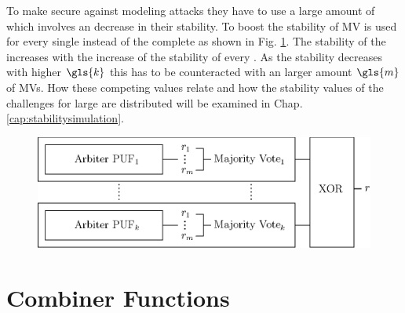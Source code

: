 To make \xpuf secure against modeling attacks they have to use a large amount of \apufs which involves an decrease in their stability.
To boost the stability of \xpufs \ac{MV} is used for every single \apuf instead of the complete \xpuf as shown in Fig. \ref{fig:majorityxorarbiter}.
The stability of the \xpuf increases with the increase of the stability of every \mpuf.
As the stability decreases with higher $\gls{k}$ this has to be counteracted with an larger amount $\gls{m}$ of \acp{MV}.
How these competing values relate and how the stability values of the challenges for large \mxpufs are distributed will be examined in Chap. \ref{cap:stabilitysimulation}.

\begin{figure}[ht]
\centering
\includegraphics[width=1.00\textwidth]{images/majority_xor_arbiter_v2.eps}
\caption{\mxpuf}
\label{fig:majorityxorarbiter}
\end{figure}


\section{Combiner Functions}
\label{sec:combinerfunctions}

